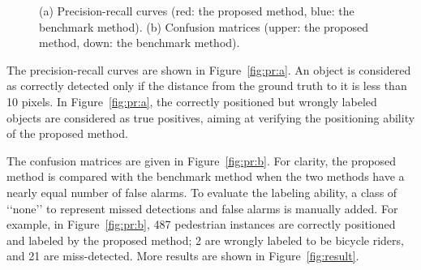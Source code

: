 \begin{figure}
{\begin{minipage}[b]{0.47\textwidth}
\end{minipage}
\label{fig:pr:b}}
\caption[Comparisons with benchmark method]{(a) Precision-recall curves (red: the proposed method, blue: the benchmark method). (b) Confusion matrices (upper: the proposed method, down: the benchmark method).}
\label{fig:pr}
\end{figure}

The precision-recall curves are shown in Figure~\ref{fig:pr:a}. An object is considered as correctly detected only if the distance from the ground truth to it is less than 10 pixels. In Figure~\ref{fig:pr:a}, the correctly positioned but wrongly labeled objects are considered as true positives, aiming at verifying the positioning ability of the proposed method.

The confusion matrices are given in Figure~\ref{fig:pr:b}. For clarity, the proposed method is compared with the benchmark method when the two methods have a nearly equal number of false alarms. To evaluate the labeling ability, a class of {\lq\lq}none{\rq\rq} to represent missed detections and false alarms is manually added. For example, in Figure~\ref{fig:pr:b}, 487 pedestrian instances are correctly positioned and labeled by the proposed method; 2 are wrongly labeled to be bicycle riders, and 21 are miss-detected. More results are shown in Figure~\ref{fig:result}.


